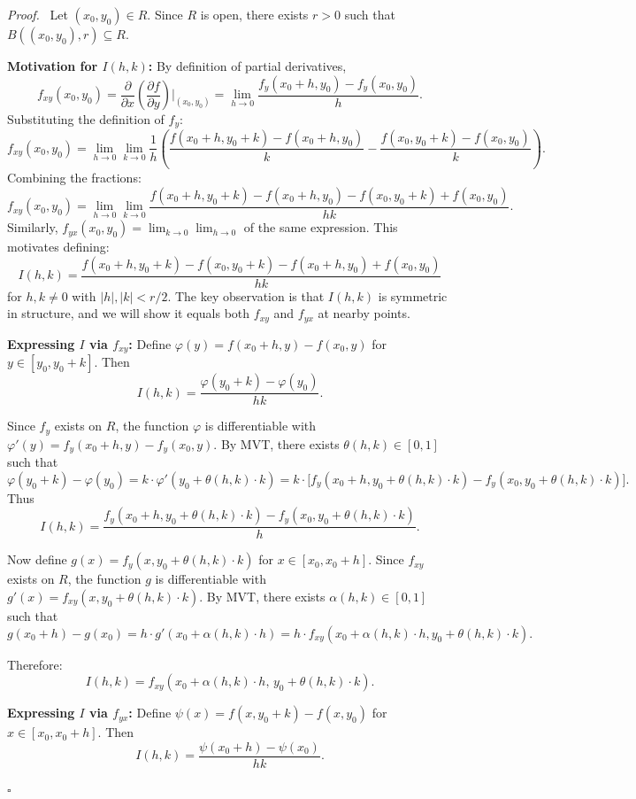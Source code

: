 \documentclass[11pt]{report}
\renewenvironment{proof}[1][Proof]{\par\noindent\textit{#1.}\ }{\hfill$\square$\par\medskip}
\begin{document}
\begin{proof}
Let $(x_0, y_0) \in R$. Since $R$ is open, there exists $r > 0$ such that $B((x_0, y_0), r) \subseteq R$.

\textbf{Motivation for $I(h,k)$:} By definition of partial derivatives,
\[
f_{xy}(x_0, y_0) = \frac{\partial}{\partial x}\left(\frac{\partial f}{\partial y}\right)\bigg|_{(x_0,y_0)} = \lim_{h \to 0} \frac{f_y(x_0 + h, y_0) - f_y(x_0, y_0)}{h}.
\]
Substituting the definition of $f_y$:
\[
f_{xy}(x_0, y_0) = \lim_{h \to 0} \lim_{k \to 0} \frac{1}{h}\left(\frac{f(x_0+h, y_0+k) - f(x_0+h, y_0)}{k} - \frac{f(x_0, y_0+k) - f(x_0, y_0)}{k}\right).
\]
Combining the fractions:
\[
f_{xy}(x_0, y_0) = \lim_{h \to 0} \lim_{k \to 0} \frac{f(x_0+h, y_0+k) - f(x_0+h, y_0) - f(x_0, y_0+k) + f(x_0, y_0)}{hk}.
\]
Similarly, $f_{yx}(x_0, y_0) = \lim_{k \to 0} \lim_{h \to 0}$ of the same expression. This motivates defining:
\[
I(h, k) = \frac{f(x_0 + h, y_0 + k) - f(x_0, y_0 + k) - f(x_0 + h, y_0) + f(x_0, y_0)}{hk}
\]
for $h, k \neq 0$ with $|h|, |k| < r/2$. The key observation is that $I(h,k)$ is symmetric in structure, and we will show it equals both $f_{xy}$ and $f_{yx}$ at nearby points.

\textbf{Expressing $I$ via $f_{xy}$:} Define $\varphi(y) = f(x_0 + h, y) - f(x_0, y)$ for $y \in [y_0, y_0 + k]$. Then
\[
I(h, k) = \frac{\varphi(y_0 + k) - \varphi(y_0)}{hk}.
\]

Since $f_y$ exists on $R$, the function $\varphi$ is differentiable with $\varphi'(y) = f_y(x_0 + h, y) - f_y(x_0, y)$. By MVT, there exists $\theta(h, k) \in [0, 1]$ such that
\[
\varphi(y_0 + k) - \varphi(y_0) = k \cdot \varphi'(y_0 + \theta(h,k) \cdot k) = k \cdot \bigl[f_y(x_0 + h, y_0 + \theta(h,k) \cdot k) - f_y(x_0, y_0 + \theta(h,k) \cdot k)\bigr].
\]
Thus
\[
I(h, k) = \frac{f_y(x_0 + h, y_0 + \theta(h,k) \cdot k) - f_y(x_0, y_0 + \theta(h,k) \cdot k)}{h}.
\]

Now define $g(x) = f_y(x, y_0 + \theta(h,k) \cdot k)$ for $x \in [x_0, x_0 + h]$. Since $f_{xy}$ exists on $R$, the function $g$ is differentiable with $g'(x) = f_{xy}(x, y_0 + \theta(h,k) \cdot k)$. By MVT, there exists $\alpha(h, k) \in [0, 1]$ such that
\[
g(x_0 + h) - g(x_0) = h \cdot g'(x_0 + \alpha(h,k) \cdot h) = h \cdot f_{xy}(x_0 + \alpha(h,k) \cdot h, y_0 + \theta(h,k) \cdot k).
\]

Therefore:
\[
I(h, k) = f_{xy}(x_0 + \alpha(h,k) \cdot h, \, y_0 + \theta(h,k) \cdot k).
\]

\textbf{Expressing $I$ via $f_{yx}$:} Define $\psi(x) = f(x, y_0 + k) - f(x, y_0)$ for $x \in [x_0, x_0 + h]$. Then
\[
I(h, k) = \frac{\psi(x_0 + h) - \psi(x_0)}{hk}.
\]


\end{proof}
\end{document}
